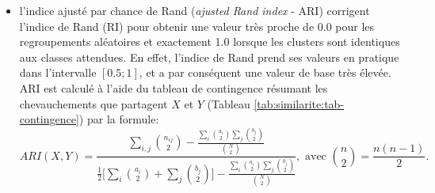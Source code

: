 \begin{itemize}
	\item l'indice ajusté par chance de Rand (\textit{ajusted Rand index} - ARI) \citep{hubert1985adjustedrandidx} corrigent l'indice de Rand (RI) \citep{rand1971randidx} pour obtenir une valeur très proche de 0.0 pour les regroupements aléatoires et exactement 1.0 lorsque les clusters sont identiques aux classes attendues. En effet, l'indice de Rand prend ses valeurs en pratique dans l'intervalle $[0.5;1]$, et a par conséquent une valeur de base très élevée. ARI est calculé à l'aide du tableau de contingence résumant les chevauchements que partagent $X$ et $Y$ (Tableau \ref{tab:similarite:tab-contingence}) par la formule: %
	\[ARI(X,Y) = \frac{\sum\limits_{i,j}\binom{n_{ij}}{2} - \frac{\sum\limits_{i}\binom{a_{i}}{2}\sum\limits_{j}\binom{b_{j}}{2}}{\binom{N}{2}}}{\frac{1}{2}\big[\sum\limits_{i}\binom{a_{i}}{2}+\sum\limits_{j}\binom{b_{j}}{2}\big] - \frac{\sum\limits_{i}\binom{a_{i}}{2}\sum\limits_{j}\binom{b_{j}}{2}}{\binom{N}{2}}}, \text{ avec } \binom{n}{2} = \frac{n(n-1)}{2}.\]
	

\end{itemize}
